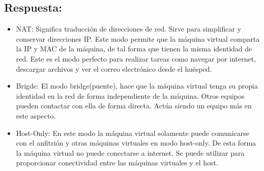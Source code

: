 \subsection{Respuesta:}
\begin{itemize}
	\item NAT: Significa traducción de direcciones de red. Sirve para simplificar y conservar direcciones IP. Este modo permite que la máquina virtual comparta la IP y MAC de la máquina, de tal forma que tienen la misma identidad de red. Este es el modo perfecto para realizar tareas como navegar por internet, descargar archivos y ver el correo electrónico desde el huésped.\cite{ManualVirtualBox} \cite{ManualVMWARE}
	\item Brigde: El modo bridge(puente), hace que la máquina virtual tenga su propia identidad en la red de forma independiente de la máquina. Otros equipos pueden contactar con ella de forma directa. Actúa siendo un equipo más en este aspecto. \cite{ManualVirtualBox} \cite{ManualVMWARE}
	\item Host-Only: En este modo la máquina virtual solamente puede comunicarse con el anfitrión y otras máquinas virtuales en modo host-only. De esta forma la máquina virtual no puede conectarse a internet. Se puede utilizar para proporcionar conectividad entre las máquinas virtuales y el host.
	\cite{ManualVirtualBox} \cite{ManualVMWARE}
\end{itemize}
\newpage


